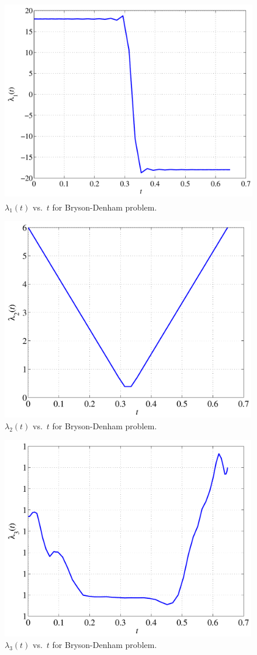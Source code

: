 \documentclass[10pt,final]{report}
\begin{document}
\begin{figure}[H]
  \centering
  \includegraphics[height=3.5in]{lambda1vstBrysonDenham.pdf}
  \caption{$\lambda_1(t)$ vs.~$t$ for Bryson-Denham problem.}
\end{figure}
\begin{figure}[H]
  \centering
  \includegraphics[height=3.5in]{lambda2vstBrysonDenham.pdf}
  \caption{$\lambda_2(t)$ vs.~$t$ for Bryson-Denham problem.}
\end{figure}
\begin{figure}[H]
  \centering
  \includegraphics[height=3.5in]{lambda3vstBrysonDenham.pdf}
  \caption{$\lambda_3(t)$ vs.~$t$ for Bryson-Denham problem.}
\end{figure}
\end{document}
